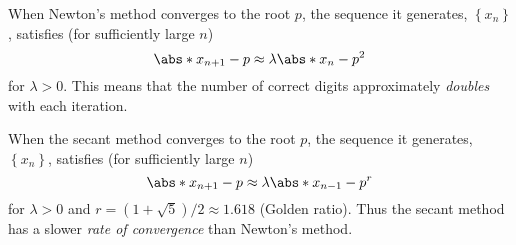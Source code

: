 \documentclass{article}
\begin{document}
When Newton's method converges to the root \(p\), the sequence it generates, \(\left\{ x_n \right\}\), satisfies (for sufficiently large \(n\))
\begin{equation*}
    \abs*{x_{n + 1} - p} \approx \lambda \abs*{x_n - p}^2
\end{equation*}
for \(\lambda > 0\). This means that the number of correct digits approximately \textit{doubles} with each iteration.

When the secant method converges to the root \(p\), the sequence it generates, \(\left\{ x_n \right\}\), satisfies (for sufficiently large \(n\))
\begin{equation*}
    \abs*{x_{n + 1} - p} \approx \lambda \abs*{x_{n - 1} - p}^r
\end{equation*}
for \(\lambda > 0\) and \(r = \left( 1 + \sqrt{5} \right)/2 \approx 1.618\) (Golden ratio).
Thus the secant method has a slower \textit{rate of convergence} than Newton's method.
\end{document}
